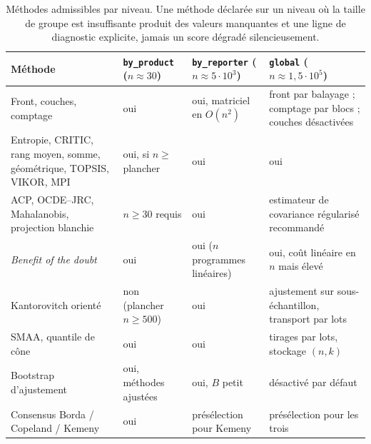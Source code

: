 \documentclass[11pt,a4paper]{article}
\theoremstyle{definition}
\theoremstyle{remark}
\begin{document}
\begin{table}[htbp]
  \centering
  \footnotesize
  \renewcommand{\arraystretch}{1.2}
  \begin{tabularx}{\textwidth}{@{}>{\hsize}Y >{\hsize}Y
                                 >{\hsize}Y >{\hsize}Y@{}}
    \toprule
    \textbf{Méthode} & \texttt{by\_product} ($n \approx 30$)
      & \texttt{by\_reporter} ($n \approx 5\cdot10^3$)
      & \texttt{global} ($n \approx 1{,}5\cdot10^5$) \\
    \midrule
    Front, couches, comptage
      & oui
      & oui, matriciel en $O(n^2)$
      & front par balayage ; comptage par blocs ; couches désactivées \\
    Entropie, CRITIC, rang moyen, somme, géométrique, TOPSIS, VIKOR, MPI
      & oui, si $n \ge$ plancher
      & oui
      & oui \\
    ACP, OCDE--JRC, Mahalanobis, projection blanchie
      & $n \ge 30$ requis
      & oui
      & estimateur de covariance régularisé recommandé \\
    \emph{Benefit of the doubt}
      & oui
      & oui ($n$ programmes linéaires)
      & oui, coût linéaire en $n$ mais élevé \\
    Kantorovitch orienté
      & non (plancher $n \ge 500$)
      & oui
      & ajustement sur sous-échantillon, transport par lots \\
    SMAA, quantile de cône
      & oui
      & oui
      & tirages par lots, stockage $(n,k)$ \\
    Bootstrap d'ajustement
      & oui, méthodes ajustées
      & oui, $B$ petit
      & désactivé par défaut \\
    Consensus Borda / Copeland / Kemeny
      & oui
      & présélection pour Kemeny
      & présélection pour les trois \\
    \bottomrule
  \end{tabularx}
  \caption{Méthodes admissibles par niveau. Une méthode déclarée sur un niveau où la taille
  de groupe est insuffisante produit des valeurs manquantes et une ligne de diagnostic
  explicite, jamais un score dégradé silencieusement.}
  \label{tab:methodes-niveaux}
\end{table}

\bigskip
\end{document}
